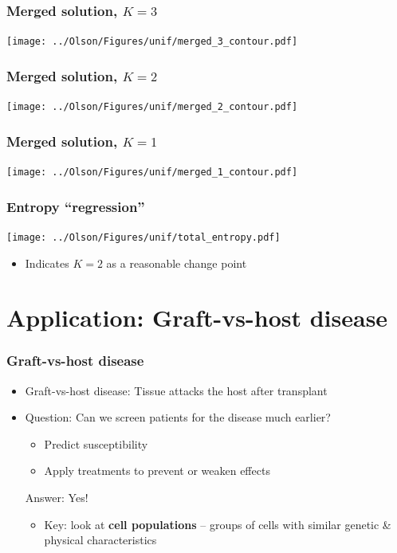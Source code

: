 \documentclass[mathserif,compress]{beamer}
\renewcommand\;{\,}
\begin{document}
\begin{frame}\frametitle{Merged solution, $K = 3$}
\begin{center}
\texttt{[image: ../Olson/Figures/unif/merged\_3\_contour.pdf]}
\end{center}
\end{frame}

\begin{frame}\frametitle{Merged solution, $K = 2$}
\begin{center}
\texttt{[image: ../Olson/Figures/unif/merged\_2\_contour.pdf]}
\end{center}
\end{frame}

\begin{frame}\frametitle{Merged solution, $K = 1$}
\begin{center}
\texttt{[image: ../Olson/Figures/unif/merged\_1\_contour.pdf]}
\end{center}
\end{frame}


\begin{frame}\frametitle{Entropy ``regression''}
\begin{center}
\texttt{[image: ../Olson/Figures/unif/total\_entropy.pdf]}
\end{center}
\begin{itemize}
\item
Indicates $K = 2$ as a reasonable change point
\end{itemize}

\end{frame}

\section{Application: Graft-vs-host disease}
\begin{frame}\frametitle{Graft-vs-host disease}
\begin{itemize}
\item[]
\alert{Graft-vs-host disease:} Tissue attacks the host after transplant
\bigskip
\item[]
\alert{Question:} Can we screen patients for the disease much earlier?
\begin{itemize}
\item
Predict susceptibility
\bigskip
\item
Apply treatments to prevent or weaken effects
\end{itemize}
\bigskip
\alert{Answer}: Yes!
\bigskip
\begin{itemize}
\item
Key: look at \textbf{cell populations} -- groups of cells with similar genetic \& physical characteristics
\end{itemize}
\end{itemize}
\end{frame}
\end{document}
